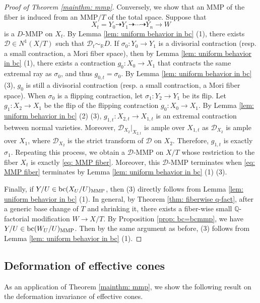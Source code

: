 \documentclass[11pt,oneside,reqno]{amsart}
\numberwithin{equation}{section}
\theoremstyle{definition}
\newcommand{\bc}{{\rm {bc}}}
\newcommand{\bQ}{\mathbb{Q}}
\newcommand{\bR}{\mathbb{R}}
\newcommand{\mD}{\mathcal{D}}
\begin{document}
\begin{proof}[Proof of Theorem \ref{mainthm: mmp}]
Conversely, we show that an MMP of the fiber is induced from an MMP$/T$ of the total space. Suppose that 
\begin{equation}\label{eq: MMP fiber}
X_t=Y_{0} \dasharrow Y_{1} \dasharrow \cdots \dasharrow Y_{n} \to W
\end{equation} 
is a $D$-MMP on $X_t$. By Lemma \ref{lem: uniform behavior in bc} (1), there exists $\mD\in N^1(X/T)$ such that $\mD_t\sim_\bR D$. If $\sigma_0: Y_0 \to Y_1$ is a divisorial contraction (resp. a small contraction, a Mori fiber space), then by Lemma \ref{lem: uniform behavior in bc} (1), there exists a contraction $g_0: X_0 \to X_1$ that contracts the same extremal ray as $\sigma_0$, and thus $g_{0,t}=\sigma_0$. By Lemma \ref{lem: uniform behavior in bc} (3), $g_0$ is still a divisorial contraction (resp. a small contraction, a Mori fiber space). When $\sigma_0$ is a flipping contraction, let $\sigma_1: Y_2 \to Y_1$ be its flip. Let $g_1: X_2 \to X_1$ be the flip of the flipping contraction $g_0: X_0 \to X_1$. By Lemma \ref{lem: uniform behavior in bc} (2) (3), $g_{1,t}: X_{2,t} \to X_{1,t}$ is an extremal contraction between normal varieties. Moreover, $\mD_{X_2}|_{X_{2,t}}$ is ample over $X_{1,t}$ as $\mD_{X_2}$ is ample over $X_1$, where $\mD_{X_2}$ is the strict transform of $\mD$ on $X_2$. Therefore, $g_{1,t}$ is exactly $\sigma_1$. Repeating this process, we obtain a $\mD$-MMP on $X/T$ whose restriction to the fiber $X_t$ is exactly \eqref{eq: MMP fiber}. Moreover, this $\mD$-MMP terminates when \eqref{eq: MMP fiber} terminates by Lemma \ref{lem: uniform behavior in bc} (1) (3).

Finally, if $Y/U\in \bc(X_{U}/U)_{\mathrm{MMP}}$, then (3) directly follows from Lemma \ref{lem: uniform behavior in bc} (1). In general, by Theorem \ref{thm: fiberwise q-fact}, after a generic base change of $T$ and shrinking it, there exists a fiber-wise small $\bQ$-factorial modification $W \to X/T$. By Proposition \ref{prop: bc=bcmmp}, we have $Y/U \in \bc(W_U/U)_{\rm MMP}$. Then by the same argument as before, (3) follows from Lemma \ref{lem: uniform behavior in bc} (1).
\end{proof}



\subsection{Deformation of effective cones}\label{subsec: def eff cone}

As an application of Theorem \ref{mainthm: mmp}, we show the following result on the deformation invariance of effective cones.
\end{document}
